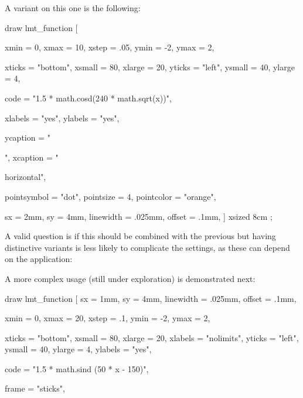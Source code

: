 \blank

A variant on this one is the following:

\startbuffer
{}
draw lmt_function [

    xmin =  0, xmax = 10, xstep = .05,
    ymin = -2, ymax =  2,

    xticks = "bottom", xsmall = 80, xlarge = 20,
    yticks = "left",   ysmall = 40, ylarge =  4,

    code = "1.5 * math.cosd(240 * math.sqrt(x))",

    xlabels = "yes",
    ylabels = "yes",

    ycaption = "\strut\tfd {}",
    xcaption = "\strut\tfd horizontal",

    pointsymbol = "dot", pointsize = 4, pointcolor = "orange",

    sx = 2mm, sy = 4mm, linewidth = .025mm, offset = .1mm,
]
    xsized 8cm
;
\stopMPcode
\stopbuffer

\typebuffer[option=TEX]

A valid question is if this should be combined with the previous but having
distinctive variants is less likely to complicate the settings, as these can
depend on the application:

\startlinecorrection
\getbuffer
\stoplinecorrection

A more complex usage (still under exploration) is demonstrated next:

\startbuffer
\definecolor[MyColorR][r=.5,t=.5,a=1]
\definecolor[MyColorG][g=.5,t=.5,a=1]
\definecolor[MyColorB][b=.5,t=.5,a=1]
\definecolor[MyColorY][r=.5,g=.5,t=.5,a=1]

draw lmt_function [
    sx = 1mm, sy = 4mm, linewidth = .025mm, offset = .1mm,

    xmin =  0, xmax = 20, xstep     = .1,
    ymin = -2, ymax =  2,

    xticks = "bottom", xsmall = 80, xlarge = 20, xlabels = "nolimits",
    yticks = "left",   ysmall = 40, ylarge =  4, ylabels = "yes",

    code  = "1.5 * math.sind (50 * x - 150)",

    frame = "sticks", %

